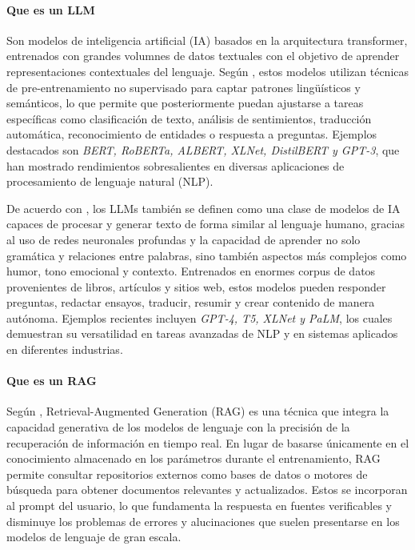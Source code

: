 \paragraph{Que es un LLM}
Son modelos de inteligencia artificial (IA) basados en la arquitectura transformer, entrenados con grandes volumnes de datos textuales con el objetivo de aprender representaciones
contextuales del lenguaje. Según \textcite{casola2022pretrained}, estos modelos utilizan técnicas de pre-entrenamiento no supervisado para captar patrones lingüísticos y semánticos,
lo que permite que posteriormente puedan ajustarse a tareas específicas como clasificación de texto, análisis de sentimientos, traducción automática, reconocimiento de entidades
o respuesta a preguntas. Ejemplos destacados son \textit{BERT, RoBERTa, ALBERT, XLNet, DistilBERT y GPT-3}, que han mostrado rendimientos sobresalientes en diversas aplicaciones de procesamiento de lenguaje natural (NLP).

De acuerdo con \textcite{ramdurai2025llm}, los LLMs también se definen como una clase de modelos de IA capaces de procesar y generar texto de forma similar al lenguaje humano,
gracias al uso de redes neuronales profundas y la capacidad de aprender no solo gramática y relaciones entre palabras, sino también aspectos más complejos como humor, 
tono emocional y contexto. Entrenados en enormes corpus de datos provenientes de libros, artículos y sitios web, estos modelos pueden responder preguntas, redactar ensayos,
traducir, resumir y crear contenido de manera autónoma. Ejemplos recientes incluyen \textit{GPT-4, T5, XLNet y PaLM}, los cuales demuestran su versatilidad en tareas avanzadas
de NLP y en sistemas aplicados en diferentes industrias. 

\paragraph{Que es un RAG}
Según \textcite{han2024rag}, Retrieval-Augmented Generation (RAG) es una técnica que integra la capacidad generativa de los modelos 
de lenguaje con la precisión de la recuperación de información en tiempo real. En lugar de basarse únicamente en el conocimiento almacenado en
los parámetros durante el entrenamiento, RAG permite consultar repositorios externos como bases de datos o motores de búsqueda para obtener
documentos relevantes y actualizados. Estos se incorporan al prompt del usuario, lo que fundamenta la respuesta en fuentes 
verificables y disminuye los problemas de errores y alucinaciones que suelen presentarse en los modelos de lenguaje de gran escala.  


